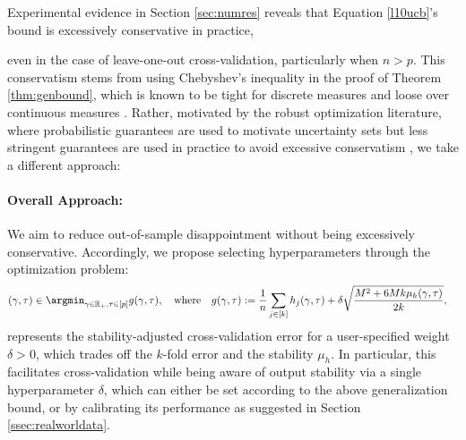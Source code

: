 \documentclass[mnsc,nonblindrev]{informs3} %
\begin{document}
{{\color{black}%
Experimental evidence in Section \ref{sec:numres} reveals that Equation \eqref{l10ucb}'s bound is excessively conservative in practice, {even in the case of leave-one-out cross-validation, %
particularly when $n>p$. This conservatism stems from using Chebyshev's inequality in the proof of Theorem \ref{thm:genbound}, which is known to be tight for discrete measures and loose over continuous measures \citep{bertsimas2005optimal}. Rather, motivated by the robust optimization literature, where probabilistic guarantees are used to motivate uncertainty sets but less stringent guarantees are used in practice to avoid excessive conservatism \citep[see][Section 3, for a detailed discussion]{gorissen2015practical}, we take a different approach:




}

\paragraph{Overall Approach:}We aim to reduce out-of-sample disappointment without being excessively conservative. Accordingly, we propose selecting hyperparameters through the optimization problem: 
\begin{align}\label{eq:param_opt}&(\gamma,\tau)\in \argmin_{\gamma\in \mathbb{R}_+,\tau\in [p]} g(\gamma,\tau),\quad \text{where}\quad g(\gamma, \tau):= \frac{1}{n} \sum_{j \in [k]} h_j(\gamma, \tau)+\delta \sqrt{\frac{M^2+6 M k \mu_h(\gamma, \tau)}{2 k}},
\end{align}
represents the stability-adjusted cross-validation error for a user-specified weight $\delta >0$, which trades off the $k$-fold error and the stability $\mu_h$. In particular, this facilitates cross-validation while being aware of output stability via a single hyperparameter $\delta$, which can either be set according to the above generalization bound, or by calibrating its performance as suggested in Section \ref{ssec:realworldata}.

}}
\end{document}
